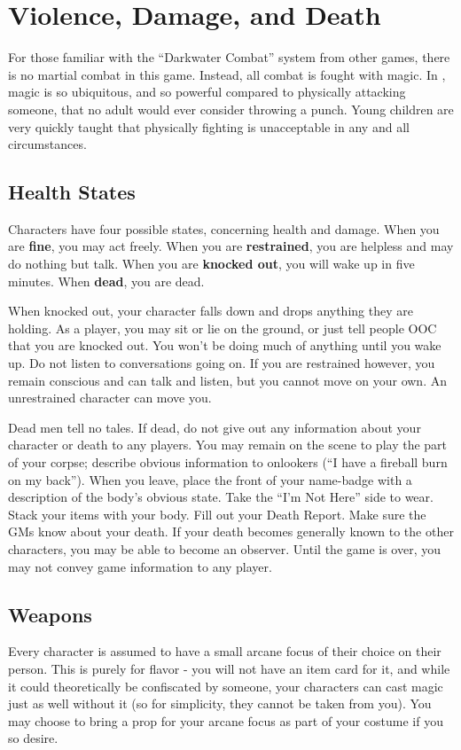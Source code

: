 \documentclass[sheet]{GL2020}
\begin{document}
\section{Violence, Damage, and Death}
For those familiar with the ``Darkwater Combat'' system from other games, there is no martial combat in this game. Instead, all combat is fought with magic. In \pEarth{}, magic is so ubiquitous, and so powerful compared to physically attacking someone, that no adult would ever consider throwing a punch. Young children are very quickly taught that physically fighting is unacceptable in any and all circumstances.

\subsection{Health States}

Characters have four possible states, concerning health and damage. When you are {\bf fine}, you may act freely. When you are {\bf restrained}, you are helpless and may do nothing but talk.  When you are {\bf knocked out}, you will wake up in five minutes. When {\bf dead}, you are dead.

When knocked out, your character falls down and drops anything they are holding. As a player, you may sit or lie on the ground, or just tell people OOC that you are knocked out. You won't be doing much of anything until you wake up. Do not listen to conversations going on. If you are restrained however, you remain conscious and can talk and listen, but you cannot move on your own. An unrestrained character can move you.

Dead men tell no tales. If dead, do not give out any information about your character or death to any players. You may remain on the scene to play the part of your corpse; describe obvious information to onlookers (``I have a fireball burn on my back''). When you leave, place the front of your name-badge with a description of the body's obvious state. Take the ``I'm Not Here'' side to wear. Stack your items with your body. Fill out your Death Report. Make sure the GMs know about your death. If your death becomes generally known to the other characters, you may be able to become an observer. Until the game is over, you may not convey game information to any player.

\subsection{Weapons}
Every character is assumed to have a small arcane focus of their choice on their person. This is purely for flavor - you will not have an item card for it, and while it could theoretically be confiscated by someone, your characters can cast magic just as well without it (so for simplicity, they cannot be taken from you). You may choose to bring a prop for your arcane focus as part of your costume if you so desire.
\end{document}
